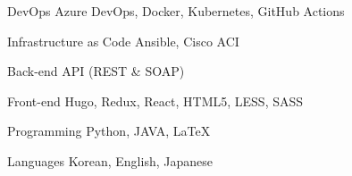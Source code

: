 

\begin{cvskills}

  \cvskill
    {DevOps} %
    {Azure DevOps, Docker, Kubernetes, GitHub Actions} %

  \cvskill
    {Infrastructure as Code} %
    {Ansible, Cisco ACI} %

  \cvskill
    {Back-end} %
    {API (REST \& SOAP)} %

  \cvskill
    {Front-end} %
    {Hugo, Redux, React, HTML5, LESS, SASS} %

  \cvskill
    {Programming} %
    {Python, JAVA, LaTeX} %

  \cvskill
    {Languages} %
    {Korean, English, Japanese} %

\end{cvskills}
